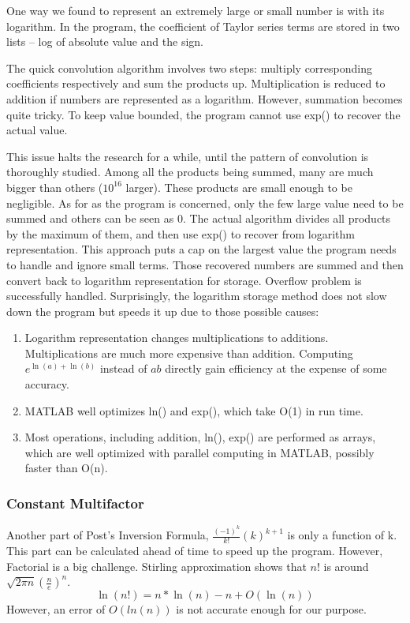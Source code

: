 \documentclass[12pt]{article}
\begin{document}
One way we found to represent an extremely large or small number is with its logarithm. In the program, the coefficient of Taylor series terms are stored in two lists -- log of absolute value and the sign.

The quick convolution algorithm involves two steps: multiply corresponding coefficients respectively and sum the products up. Multiplication is reduced to addition if numbers are represented as a logarithm. However, summation becomes quite tricky. To keep value bounded, the program cannot use exp() to recover the actual value.

This issue halts the research for a while, until the pattern of convolution is thoroughly studied. Among all the products being summed, many are much bigger than others ($10^{16}$ larger). These products are small enough to be negligible.
As for as the program is concerned, only the few large value need to be summed and others can be seen as 0. The actual algorithm divides all products by the maximum of them, and then use exp() to recover from logarithm representation. This approach puts a cap on the largest value the program needs to handle and ignore small terms. Those recovered numbers are summed and then convert back to logarithm representation for storage. Overflow problem is successfully handled.
Surprisingly, the logarithm storage method does not slow down the program but speeds it up due to those possible causes:
\begin{enumerate}
\item Logarithm representation changes multiplications to additions. Multiplications are much more expensive than addition. Computing $e^{\ln(a)+\ln(b)}$ instead of $a b$ directly gain efficiency at the expense of some accuracy.
\item MATLAB well optimizes ln() and exp(), which take O(1) in run time.
\item Most operations, including addition, ln(), exp() are performed as arrays, which are well optimized with parallel computing in MATLAB, possibly faster than O(n).
\end{enumerate}

\subsubsection{Constant Multifactor}

Another part of Post's Inversion Formula, $\frac{(-1)^{k}}{k!} (k)^{k+1}$ is only a function of k. This part can be calculated ahead of time to speed up the program. However, Factorial is a big challenge. Stirling approximation shows that $n!$ is around $\sqrt{2\pi n }(\frac{n}{e})^{n}$.
$$\ln(n!) = n*\ln(n) - n + O(\ln(n)) $$
However, an error of $O(ln(n))$ is not accurate enough for our purpose. 
\end{document}
